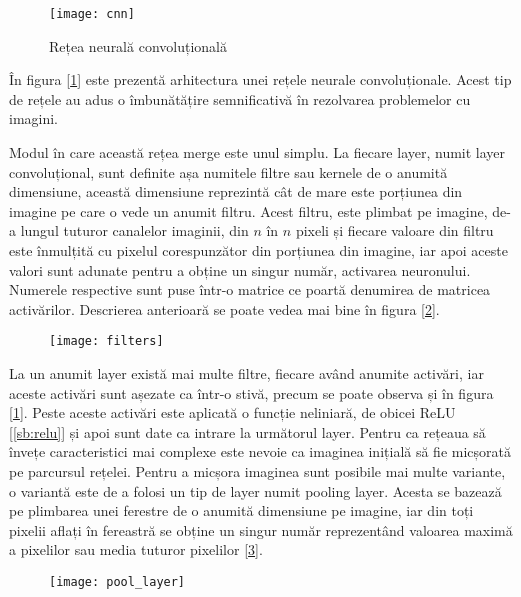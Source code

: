 \begin{figure}[H]
	\centering
	\texttt{[image: cnn]}
	\caption{Rețea neurală convoluțională \cite{lecun-98}}
	\label{fig:cnn}
\end{figure}

În figura [\ref{fig:cnn}] este prezentă arhitectura unei rețele neurale convoluționale. Acest tip de rețele au adus o îmbunătățire semnificativă în rezolvarea problemelor cu imagini.

Modul în care această rețea merge este unul simplu. La fiecare layer, numit layer convoluțional, sunt definite așa numitele filtre sau kernele de o anumită dimensiune, această dimensiune reprezintă cât de mare este porțiunea din imagine pe care o vede un anumit filtru. Acest filtru, este plimbat pe imagine, de-a lungul tuturor canalelor imaginii, din $n$ în $n$ pixeli și fiecare valoare din filtru este înmulțită cu pixelul corespunzător din porțiunea din imagine, iar apoi aceste valori sunt adunate pentru a obține un singur număr, activarea neuronului. Numerele respective sunt puse într-o matrice ce poartă denumirea de matricea activărilor. Descrierea anterioară se poate vedea mai bine în figura [\ref{fig:filters}].

\begin{figure}[H]
	\centering
	\texttt{[image: filters]}
	\caption{\cite{filters}}
	\label{fig:filters}
\end{figure}

La un anumit layer există mai multe filtre, fiecare având anumite activări, iar aceste activări sunt așezate ca într-o stivă, precum se poate observa și în figura [\ref{fig:cnn}]. Peste aceste activări este aplicată o funcție neliniară, de obicei ReLU [\ref{sb:relu}] și apoi sunt date ca intrare la următorul layer. Pentru ca rețeaua să învețe caracteristici mai complexe este nevoie ca imaginea inițială să fie micșorată pe parcursul rețelei. Pentru a micșora imaginea sunt posibile mai multe variante, o variantă este de a folosi un tip de layer numit pooling layer. Acesta se bazează pe plimbarea unei ferestre de o anumită dimensiune pe imagine, iar din toți pixelii aflați în fereastră se obține un singur număr reprezentând valoarea maximă a pixelilor sau media tuturor pixelilor [\ref{fig:pool_layer}].

\begin{figure}[h]
	\centering
	\texttt{[image: pool\_layer]}
	\caption{\cite{pooling}}
	\label{fig:pool_layer}
\end{figure}

